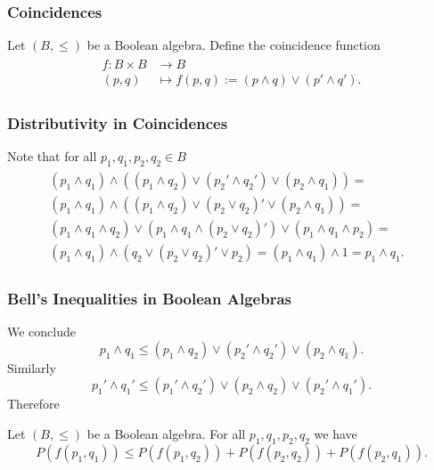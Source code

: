 \documentclass{beamer}
\begin{document}
\begin{frame}

	\frametitle{Coincidences}
	
	Let $(B,\leq)$ be a Boolean algebra. Define the coincidence function
	\begin{align}
	\begin{split}
		f:B\times B&\rightarrow B\\
		(p,q)&\mapsto f(p,q):=(p\wedge q)\vee(p'\wedge q').
	\end{split}
	\end{align}
	
\end{frame}

\begin{frame}

	\frametitle{Distributivity in Coincidences}

	Note that for all $p_1,q_1,p_2,q_2\in B$
	\begin{align}
	\begin{split}
		(p_1\wedge q_1)\wedge((p_1\wedge q_2)\vee(p_2'\wedge q_2')\vee(p_2\wedge q_1))=&\\
		(p_1\wedge q_1)\wedge((p_1\wedge q_2)\vee(p_2\vee q_2)'\vee(p_2\wedge q_1))=&\\
		(p_1\wedge q_1\wedge q_2)\vee(p_1\wedge q_1\wedge (p_2\vee q_2)')\vee(p_1\wedge q_1\wedge p_2)=&\\
		(p_1\wedge q_1)\wedge(q_2\vee(p_2\vee q_2)'\vee p_2)=(p_1\wedge q_1)\wedge 1=p_1\wedge q_1.&
	\end{split}
	\end{align}

\end{frame}
	
\begin{frame}
	
	\frametitle{Bell's Inequalities in Boolean Algebras}
	
	We conclude
	\begin{equation}
		p_1\wedge q_1\leq(p_1\wedge q_2)\vee(p_2'\wedge q_2')\vee(p_2\wedge q_1). 
	\end{equation}	
	Similarly
	\begin{equation}
		p_1'\wedge q_1'\leq(p_1'\wedge q_2')\vee(p_2\wedge q_2)\vee(p_2'\wedge q_1').
	\end{equation}
	Therefore
	\begin{theorem}
	
		Let $(B,\leq)$ be a Boolean algebra. For all $p_1,q_1,p_2,q_2$ we have
		\begin{equation}
			P(f(p_1,q_1))\leq P(f(p_1,q_2))+P(f(p_2,q_2))+P(f(p_2,q_1)).
		\end{equation}			
	
	\end{theorem}
	
\end{frame}		
\end{document}
